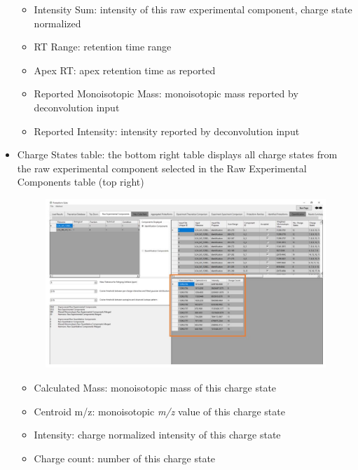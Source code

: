\begin{itemize}
\begin{itemize}
		\item Intensity Sum: intensity of this raw experimental component, charge state normalized
		\item RT Range: retention time range
		\item Apex RT: apex retention time as reported
		\item Reported Monoisotopic Mass: monoisotopic mass reported by deconvolution input
		\item Reported Intensity: intensity reported by deconvolution input
	\end{itemize}
	\item Charge States table: the bottom right table displays all charge states from the raw experimental component selected in the Raw Experimental Components table (top right)
		\begin{figure}[h]
\centering
\includegraphics[scale=0.5]{figures/rawcomponents4.jpg}
\end{figure}
	\begin{itemize}
		\item Calculated Mass: monoisotopic mass of this charge state
		\item Centroid m/z: monoisotopic \textit{m/z} value of this charge state
		\item Intensity: charge normalized intensity of this charge state
		\item Charge count: number of this charge state
	\end{itemize}
\end{itemize}